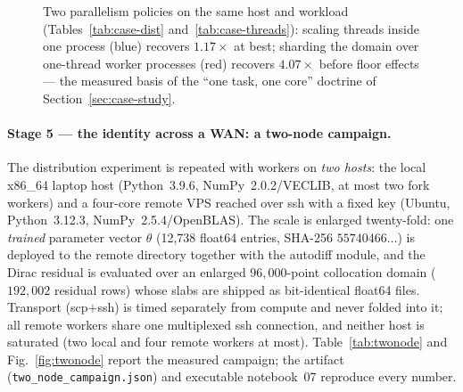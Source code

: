 \documentclass[11pt,a4paper]{article}
\theoremstyle{plain}
\theoremstyle{definition}
\begin{document}
\begin{figure}[h]
\centering
{}
\caption{Two parallelism policies on the same host and workload
(Tables~\protect\ref{tab:case-dist} and~\protect\ref{tab:case-threads}): scaling threads
inside one process (blue) recovers $1.17\times$ at best; sharding the
domain over one-thread worker processes (red) recovers $4.07\times$
before floor effects --- the measured basis of the ``one task, one
core'' doctrine of Section~\protect\ref{sec:case-study}.}
\label{fig:threads}
\end{figure}

\paragraph{Stage 5 --- the identity across a WAN: a two-node campaign.}
The distribution experiment is repeated with workers on \emph{two hosts}:
the local x86\_64 laptop host (Python~3.9.6, NumPy~2.0.2/VECLIB, at most
two fork workers) and a four-core remote VPS reached over ssh with a fixed
key (Ubuntu, Python~3.12.3, NumPy~2.5.4/OpenBLAS). The scale is enlarged
twenty-fold: one \emph{trained} parameter vector $\theta$ (12{,}738
float64 entries, SHA-256 $55740466\ldots$) is deployed to the remote
directory together with the autodiff module, and the Dirac residual is
evaluated over an enlarged $96{,}000$-point collocation domain
($192{,}002$ residual rows) whose slabs are shipped as bit-identical
float64 files. Transport (scp$+$ssh) is timed separately from compute and
never folded into it; all remote workers share one multiplexed ssh
connection, and neither host is saturated (two local and four remote
workers at most). Table~\ref{tab:twonode} and Fig.~\ref{fig:twonode}
report the measured campaign; the artifact
(\texttt{two\_node\_campaign.json}) and executable notebook~07 reproduce
every number.
\end{document}
